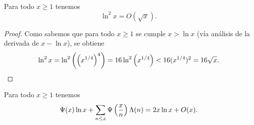 \begin{lemma}
  \label{lem:ln2x-is-sqrtx}
  Para todo \(x \geq 1\) tenemos
  \[
    \ln^2 x = O(\sqrt{x}).
  \]
\end{lemma}

\begin{proof}
  Como sabemos que para todo \(x \geq 1\) se cumple \(x > \ln x\)
  (v\'ia an\'alisis de la  derivada de \(x - \ln x\)), se obtiene
  \[
    \ln^2 x
    = \ln^2 \left( \left( x^{1/4} \right)^4 \right)
    = 16 \ln^2 \left( x^{1/4} \right)
    < 16 (x^{1/4})^2
    = 16 \sqrt{x}.
  \]
\end{proof}

\begin{lemma}
  \label{lem:psi-2xlnx-ox}
  Para todo \(x \geq 1\) tenemos
  \[
    \Psi(x) \ln x + \sum_{n \leq x}
    \Psi\left( \frac{x}{n} \right)\Lambda(n) = 2x\ln x + O(x).
  \]
\end{lemma}

